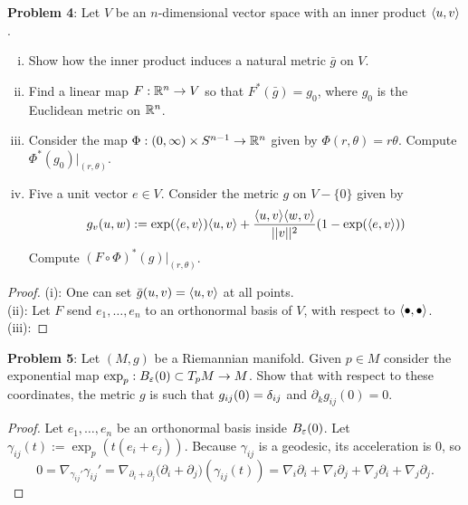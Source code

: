 \documentclass{amsart}
\begin{document}
	\textbf{Problem 4}: Let $V$ be an $n$-dimensional vector space with an inner product $\langle u,v\rangle$.
	\begin{enumerate}[(i)]
		\item Show how the inner product induces a natural metric $\bar{g}$ on $V$.
		\item Find a linear map $F:\mathbb{R}^n\to V$ so that $F^*(\bar{g})=g_0$, where $g_0$ is the Euclidean metric on $\mathbb{R}^n$.
		\item Consider the map $\Phi:(0,\infty)\times S^{n-1}\to \mathbb{R}^n$ given by $\Phi(r,\theta )=r\theta$. Compute $\Phi^*(g_0)|_{(r,\theta)}$.
		\item Five a unit vector $e\in V$. Consider the metric $g$ on $V-\{0\}$ given by 
		$$
		g_v(u,w) := \exp(\langle e,v\rangle)\langle u,v\rangle + \frac{\langle u,v\rangle\langle w,v\rangle}{||v||^2}(1-\exp(\langle e,v\rangle))
		$$
		Compute $(F\circ \Phi)^*(g)|_{(r,\theta)}$.
	\end{enumerate}
	\begin{proof}
		(i): One can set $\bar{g}(u,v)=\langle u,v\rangle$ at all points.\\
		
		(ii): Let $F$ send $e_1,\dots,e_n$ to an orthonormal basis of $V$, with respect to $\langle\bullet,\bullet\rangle$.\\
		
		(iii): 
	\end{proof}
	\newpage
	\textbf{Problem 5}: Let $(M,g)$ be a Riemannian manifold. Given $p\in M$ consider the exponential map $\exp_p:B_{\varepsilon}(0)\subset T_pM\to M$. Show that with respect to these coordinates, the metric $g$ is such that $g_{ij}(0)=\delta_{ij}$ and $\partial_kg_{ij}(0)=0$.
	\begin{proof}
		Let $e_1,\dots,e_n$ be an orthonormal basis inside $B_{\varepsilon}(0)$. Let $\gamma_{ij}(t):= \exp_p(t(e_i+e_j))$. Because $\gamma_{ij}$ is a geodesic, its acceleration is 0, so
		$$
		0 = \nabla_{\gamma_{ij}'} \gamma_{ij}' = \nabla_{\partial_i + \partial_j} \Big(\partial_i + \partial_j\Big)(\gamma_{ij}(t)) = \nabla_{i}\partial_i + \nabla_i\partial_j + \nabla_j\partial_i + \nabla_j\partial_j.
		$$ 
		
	\end{proof}
	
\end{document}
